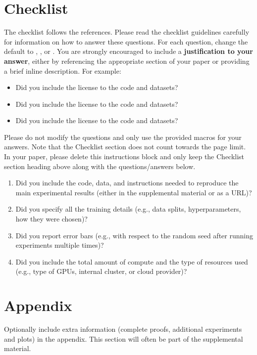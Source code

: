 \documentclass{article}
\begin{document}
\section*{Checklist}


The checklist follows the references.  Please
read the checklist guidelines carefully for information on how to answer these
questions.  For each question, change the default \answerTODO{} to \answerYes{},
\answerNo{}, or \answerNA{}.  You are strongly encouraged to include a {\bf
justification to your answer}, either by referencing the appropriate section of
your paper or providing a brief inline description.  For example:
\begin{itemize}
  \item Did you include the license to the code and datasets? 
  \item Did you include the license to the code and datasets? 
  \item Did you include the license to the code and datasets? \answerNA{}
\end{itemize}
Please do not modify the questions and only use the provided macros for your
answers.  Note that the Checklist section does not count towards the page
limit.  In your paper, please delete this instructions block and only keep the
Checklist section heading above along with the questions/answers below.




\begin{enumerate}
  \item Did you include the code, data, and instructions needed to reproduce the main experimental results (either in the supplemental material or as a URL)?
    \answerTODO{}
  \item Did you specify all the training details (e.g., data splits, hyperparameters, how they were chosen)?
    \answerTODO{}
        \item Did you report error bars (e.g., with respect to the random seed after running experiments multiple times)?
    \answerTODO{}
        \item Did you include the total amount of compute and the type of resources used (e.g., type of GPUs, internal cluster, or cloud provider)?
    \answerTODO{}

\end{enumerate}




\appendix


\section{Appendix}


Optionally include extra information (complete proofs, additional experiments and plots) in the appendix.
This section will often be part of the supplemental material.
\end{document}

